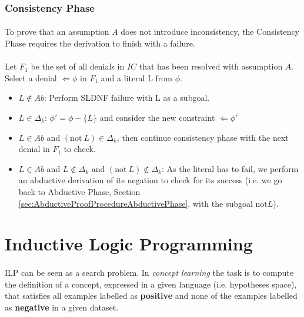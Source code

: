\documentclass{article}
\theoremstyle{plain}
\theoremstyle{definition}
\begin{document}
\begin{multicols}{2}
\subsubsection{Consistency Phase}\label{sec:AbductiveProofProcedureConsistencyPhase}

\paragraph{} To prove that an assumption $A$ does not introduce inconsistency, the Consistency Phase requires the derivation to finish with a failure.

\paragraph{} Let $F_1$ be the set of all denials in $IC$ that has been resolved with assumption $A$. Select a denial $\Leftarrow \phi$ in $F_1$ and a literal L from $\phi$.

\begin{itemize}
\item $L \not\in Ab$: Perform SLDNF failure with L as a subgoal.
\item $L \in \Delta_k$: $\phi' = \phi - \{L\}$ and consider the new constraint $\Leftarrow \phi'$\
\item $L \in Ab$ and $(\text{not}\ L) \in \Delta_k$, then continue consistency phase with the next denial in $F_1$ to check.
\item $L \in Ab$ and $L \not\in \Delta_k$ and $(\text{not}\ L) \not\in \Delta_k$: As the literal has to fail, we perform an abductive derivation of its negation to check for its success (i.e. we go back to Abductive Phase, Section \ref{sec:AbductiveProofProcedureAbductivePhase}, with the subgoal $\text{not} L$). 
\end{itemize}

\section{Inductive Logic Programming}

\paragraph{} ILP can be seen as a search problem. In \textit{concept learning} the task is to compute the definition of a concept, expressed in a given language (i.e. hypotheses space), that satisfies all examples labelled as \textbf{positive} and none of the examples labelled as \textbf{negative} in a given dataset.


\end{multicols}
\end{document}
